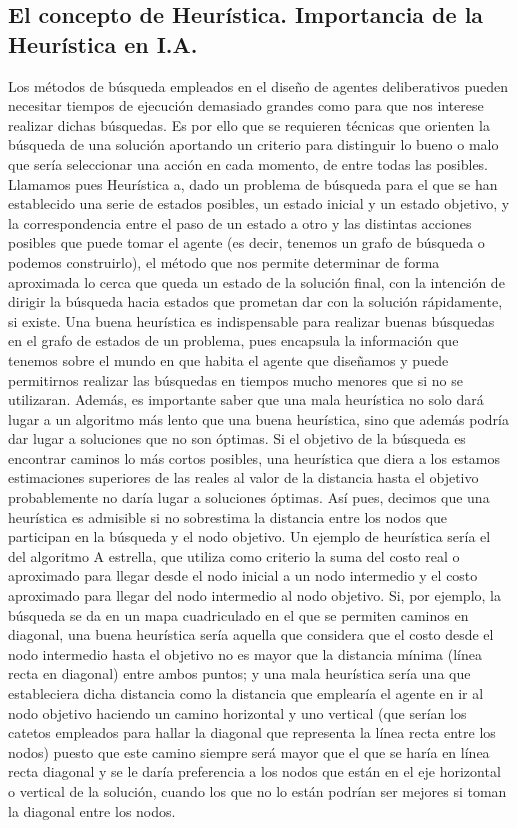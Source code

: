 \documentclass[a4paper, 11pt]{article}
\begin{document}
\subsection{El concepto de Heurística. Importancia de la Heurística en I.A.}
Los métodos de búsqueda empleados en el diseño de agentes deliberativos pueden necesitar tiempos de ejecución demasiado grandes como para que nos interese realizar dichas búsquedas. Es por ello que se requieren técnicas que orienten la búsqueda de una solución aportando un criterio para distinguir lo bueno o malo que sería seleccionar una acción en cada momento, de entre todas las posibles. Llamamos pues Heurística a, dado un problema de búsqueda para el que se han establecido una serie de estados posibles, un estado inicial y un estado objetivo, y la correspondencia entre el paso de un estado a otro y las distintas acciones posibles que puede tomar el agente (es decir, tenemos un grafo de búsqueda o podemos construirlo), el método que nos permite determinar de forma aproximada lo cerca que queda un estado de la solución final, con la intención de dirigir la búsqueda hacia estados que prometan dar con la solución rápidamente, si existe. 
Una buena heurística es indispensable para realizar buenas búsquedas en el grafo de estados de un problema, pues encapsula la información que tenemos sobre el mundo en que habita el agente que diseñamos y puede permitirnos realizar las búsquedas en tiempos mucho menores que si no se utilizaran. Además, es importante saber que una mala heurística no solo dará lugar a un algoritmo más lento que una buena heurística, sino que además podría dar lugar a soluciones que no son óptimas. Si el objetivo de la búsqueda es encontrar caminos lo más cortos posibles, una heurística que diera a los estamos estimaciones superiores de las reales al valor de la distancia hasta el objetivo probablemente no daría lugar a soluciones óptimas. Así pues, decimos que una heurística es admisible si no sobrestima la distancia entre los nodos que participan en la búsqueda y el nodo objetivo. Un ejemplo de heurística sería el del algoritmo A estrella, que utiliza como criterio la suma del costo real o aproximado para llegar desde el nodo inicial a un nodo intermedio y el costo aproximado para llegar del nodo intermedio al nodo objetivo. Si, por ejemplo, la búsqueda se da en un mapa cuadriculado en el que se permiten caminos en diagonal, una buena heurística sería aquella que considera que el costo desde el nodo intermedio hasta el objetivo no es mayor que la distancia mínima (línea recta en diagonal) entre ambos puntos; y una mala heurística sería una que estableciera dicha distancia como la distancia que emplearía el agente en ir al nodo objetivo haciendo un camino horizontal y uno vertical (que serían los catetos empleados para hallar la diagonal que representa la línea recta entre los nodos) puesto que este camino siempre será mayor que el que se haría en línea recta diagonal y se le daría preferencia a los nodos que están en el eje horizontal o vertical de la solución, cuando los que no lo están podrían ser mejores si toman la diagonal entre los nodos.
\end{document}

